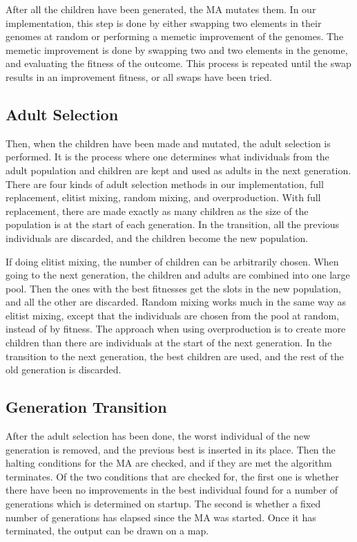 After all the children have been generated, the MA mutates them. In our implementation, this step is done by either swapping two elements in their genomes at random or performing a memetic improvement of the genomes. The memetic improvement is done by swapping two and two elements in the genome, and evaluating the fitness of the outcome. This process is repeated until the swap results in an improvement fitness, or all swaps have been tried.

\subsection{Adult Selection} %
\label{sub:achitecture_adult_selection}

Then, when the children have been made and mutated, the adult selection is performed. It is the process where one determines what individuals from the adult population and children are kept and used as adults in the next generation. There are four kinds of adult selection methods in our implementation, full replacement, elitist mixing, random mixing, and overproduction. With full replacement, there are made exactly as many children as the size of the population is at the start of each generation. In the transition, all the previous individuals are discarded, and the children become the new population.

If doing elitist mixing, the number of children can be arbitrarily chosen. When going to the next generation, the children and adults are combined into one large pool. Then the ones with the best fitnesses get the slots in the new population, and all the other are discarded. Random mixing works much in the same way as elitist mixing, except that the individuals are chosen from the pool at random, instead of by fitness. The approach when using overproduction is to create more children than there are individuals at the start of the next generation. In the transition to the next generation, the best children are used, and the rest of the old generation is discarded.


\subsection{Generation Transition} %
\label{sub:achitecture_generation_transition}


After the adult selection has been done, the worst individual of the new generation is removed, and the previous best is inserted in its place. Then the halting conditions for the MA are checked, and if they are met the algorithm terminates. Of the two conditions that are checked for, the first one is whether there have been no improvements in the best individual found for a number of generations which is determined on startup. The second is whether a fixed number of generations has elapsed since the MA was started. Once it has terminated, the output can be drawn on a map.


\cleardoublepage
